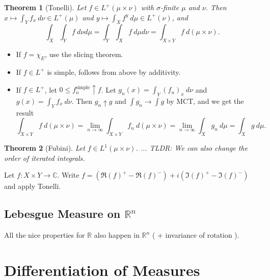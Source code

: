 \documentclass[11pt]{article}
\newtheorem{thm}{Theorem}[section]
\theoremstyle{definition}
\newcommand{\RR}{\mathbb{R}}
\newcommand{\CC}{\mathbb{C}}
\begin{document}
\begin{thm}[Tonelli]
Let $f\in L^+(\mu\times\nu)$ with $\sigma$-finite $\mu$ and $\nu$. Then
$x\mapsto\int_Yf_x~d\nu\in L^+(\mu)$ and $y\mapsto\int_Xf^y~d\mu\in L^+(\nu)$, and
\[
  \int_X\int_Yf~d\nu d\mu = \int_Y\int_Xf~d\mu d\nu = \int_{X\times Y}f~d(\mu\times\nu) . 
\]
\end{thm}
\proof
  \begin{itemize}
    \item If $f=\chi_E$, use the slicing theorem. 
    \item If $f\in L^+$ is simple, follows from above by additivity.
    \item If $f\in L^+$, let $0\le f_n^\text{simple}\uparrow f$. Let
    $g_n(x)=\int_Y(f_n)_x~d\nu$ and $g(x)=\int_Yf_x~d\nu$. Then $g_n\uparrow g$ and $\int
    g_n \to \int g$ by MCT, and we get the result
    \[
      \int_{X\times Y}f~d(\mu\times\nu) = \lim_{n\to\infty}\int_{X\times
      Y}f_n~d(\mu\times\nu) = \lim_{n\to\infty}\int_Xg_n~d\mu = \int_Xg~d\mu .
    \]
  \end{itemize}
\qedhere

\begin{thm}[Fubini]
  Let $f\in L^1(\mu\times\nu)$. ... TLDR: We can also change the order of iterated integrals. 
\end{thm}
\proof
  Let $f:X\times Y\to\CC$. Write $f=(\Re(f)^+-\Re(f)^-)+i(\Im(f)^+-\Im(f)^-)$ and apply
  Tonelli. 
\qedhere

\subsection{Lebesgue Measure on $\RR^n$}
All the nice properties for $\RR$ also happen in $\RR^n$ ( + invariance of rotation ). 







\section{Differentiation of Measures}

\end{document}
